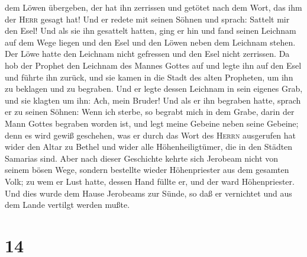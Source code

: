 dem Löwen übergeben, der hat ihn zerrissen und getötet nach dem Wort,
das ihm der \textsc{Herr} gesagt hat!  Und er redete mit
seinen Söhnen und sprach: Sattelt mir den Esel! Und als sie ihn
gesattelt hatten,  ging er hin und fand seinen Leichnam
auf dem Wege liegen und den Esel und den Löwen neben dem Leichnam
stehen. Der Löwe hatte den Leichnam nicht gefressen und den Esel nicht
zerrissen.  Da hob der Prophet den Leichnam des Mannes
Gottes auf und legte ihn auf den Esel und führte ihn zurück, und sie
kamen in die Stadt des alten Propheten, um ihn zu beklagen und zu
begraben.  Und er legte dessen Leichnam in sein eigenes
Grab, und sie klagten um ihn: Ach, mein Bruder!  Und als
er ihn begraben hatte, sprach er zu seinen Söhnen: Wenn ich sterbe, so
begrabt mich in dem Grabe, darin der Mann Gottes begraben worden ist,
und legt meine Gebeine neben seine Gebeine;  denn es wird
gewiß geschehen, was er durch das Wort des \textsc{Herrn} ausgerufen hat
wider den Altar zu Bethel und wider alle Höhenheiligtümer, die in den
Städten Samarias sind.  Aber nach dieser Geschichte
kehrte sich Jerobeam nicht von seinem bösen Wege, sondern bestellte
wieder Höhenpriester aus dem gesamten Volk; zu wem er Lust hatte, dessen
Hand füllte er, und der ward Höhenpriester.  Und dies
wurde dem Hause Jerobeams zur Sünde, so daß er vernichtet und aus dem
Lande vertilgt werden mußte.

\hypertarget{section-13}{%
\section{14}\label{section-13}}

